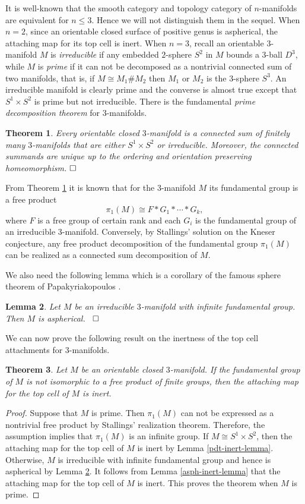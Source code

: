\documentclass[a4]{amsart}
\newtheorem{theorem}{Theorem}[section]
\newtheorem{lemma}[theorem]{Lemma}
\theoremstyle{definition}
\newcommand{\qqed}{\hfill\Box}
\begin{document}
\begin{sloppypar}
It is well-known that the smooth category and topology category of $n$-manifolds are equivalent for $n\leq 3$. Hence we will not distinguish them in the sequel. 
When $n=2$, since an orientable closed surface of positive genus is aspherical, the attaching map for its top cell is inert. When $n=3$, recall an orientable $3$-manifold $M$ is {\it irreducible} if any embedded $2$-sphere $S^2$ in $M$ bounds a $3$-ball $D^3$, while $M$ is {\it prime} if it can not be decomposed as a nontrivial connected sum of two manifolds, that is, if $M\cong M_1\# M_2$ then $M_1$ or $M_2$ is the $3$-sphere $S^3$. An irreducible manifold is clearly prime and the converse is almost true except that $S^1\times S^2$ is prime but not irreducible. 
There is the fundamental {\it prime decomposition theorem} for $3$-manifolds.
\begin{theorem}\label{pdecthm}
Every orientable closed $3$-manifold is a connected sum of finitely many $3$-manifolds that are either $S^1\times S^2$ or irreducible. Moreover, the connected summands are unique up to the ordering and orientation preserving homeomorphism. $\qqed$
\end{theorem}
From Theorem \ref{pdecthm} it is known that for the $3$-manifold $M$ its fundamental group is a free product
\[
\pi_1(M)\cong F \ast G_1\ast \cdots \ast G_k,
\]
where $F$ is a free group of certain rank and each $G_i$ is the fundamental group of an irreducible $3$-manifold. Conversely, by Stallings' solution \cite{Sta71} on the Kneser conjecture, any free product decomposition of the fundamental group $\pi_1(M)$ can be realized as a connected sum decomposition of $M$.

We also need the following lemma which is a corollary of the famous sphere theorem of Papakyriakopoulos \cite{Pap57}.
\begin{lemma}\label{asphlemma}
Let $M$ be an irreducible $3$-manifold with infinite fundamental group. Then $M$ is aspherical. ~$\qqed$
\end{lemma}
We can now prove the following result on the inertness of the top cell attachments for $3$-manifolds. 
\begin{theorem}\label{3inertthm}
Let $M$ be an orientable closed $3$-manifold. If the fundamental group of $M$ is not isomorphic to a free product of finite groups, then the attaching map for the top cell of $M$ is inert.
\end{theorem}
\begin{proof}
Suppose that $M$ is prime. Then $\pi_1(M)$ can not be expressed as a nontrivial free product by Stallings' realization theorem. Therefore, the assumption implies that $\pi_1(M)$ is an infinite group. If $M\cong S^1\times S^2$, then the attaching map for the top cell of $M$ is inert by Lemma \ref{pdt-inert-lemma}. Otherwise, $M$ is irreducible with infinite fundamental group and hence is aspherical by Lemma \ref{asphlemma}. It follows from Lemma \ref{asph-inert-lemma} that the attaching map for the top cell of $M$ is inert. This proves the theorem when $M$ is prime.


\end{proof}
\end{sloppypar}
\end{document}
